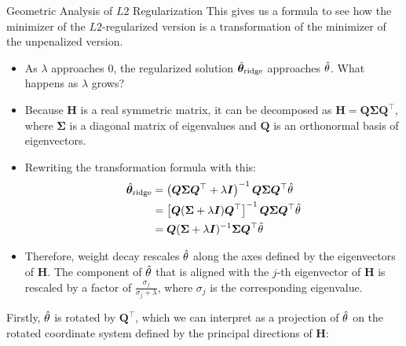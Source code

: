 \documentclass[11pt,compress,t,notes=noshow, xcolor=table]{beamer}
\begin{document}
\begin{vbframe}{Geometric Analysis of $L2$ Regularization}
This gives us a formula to see how the minimizer of the $L2$-regularized version is a transformation of the minimizer of the unpenalized version.
\vspace{0.2cm}



\framebreak

  \begin{itemize}
    \item As $\lambda$ approaches $0$, the regularized solution $\hat{\bm{\theta}}_{\text{ridge}}$ approaches $\hat{\theta}$. What happens as $\lambda$ grows?
    \item Because $\bm{H}$ is a real symmetric matrix, it can be decomposed as $\bm{H} = \bm{Q} \bm{\Sigma} \bm{Q}^\top$, where $\bm{\Sigma}$ is a diagonal matrix of eigenvalues and $\bm{Q}$ is an orthonormal basis of eigenvectors.
    \item Rewriting the transformation formula with this:
  \begin{equation*}
    \begin{aligned} 
    \hat{\bm{\theta}}_{\text{ridge}} &=\left(\bm{Q} \bm{\Sigma} \bm{Q}^{\top}+\lambda \boldsymbol{I}\right)^{-1} \bm{Q} \bm{\Sigma} \bm{Q}^{\top} \hat{\theta} \\ 
              &=\left[\bm{Q}(\bm{\Sigma}+\lambda \boldsymbol{I}) \bm{Q}^{\top}\right]^{-1} \bm{Q} \bm{\Sigma} \bm{Q}^{\top} \hat{\theta} \\ 
              &=\bm{Q}(\bm{\Sigma} + \lambda \boldsymbol{I})^{-1} \bm{\Sigma} \bm{Q}^{\top} \hat{\theta} 
    \end{aligned}
  \end{equation*}
    \item Therefore, weight decay rescales $\hat{\theta}$ along the axes defined by the eigenvectors of $\bm{H}$. The component of $\hat{\theta}$ that is aligned with the $j$-th eigenvector of $\bm{H}$ is rescaled by a factor of $\frac{\sigma_j}{\sigma_j + \lambda}$, where $\sigma_j$ is the corresponding eigenvalue.
\end{itemize}

\framebreak

Firstly, $\hat{\theta}$ is rotated by $\bm{Q}^{\top}$, which we can interpret as a projection of $\hat{\theta}$ on the rotated coordinate system defined by the principal directions of $\bm{H}$:


\end{vbframe}
\end{document}
